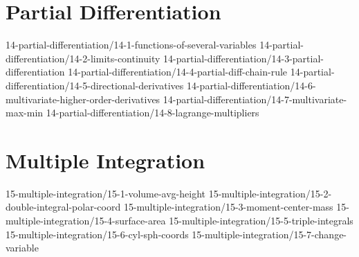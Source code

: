 
	
\chapter{Partial Differentiation}\label{chap:PartialDifferentiation}
	{14-partial-differentiation/14-1-functions-of-several-variables}
	{14-partial-differentiation/14-2-limits-continuity}
	{14-partial-differentiation/14-3-partial-differentiation}
	{14-partial-differentiation/14-4-partial-diff-chain-rule}
	{14-partial-differentiation/14-5-directional-derivatives}
	{14-partial-differentiation/14-6-multivariate-higher-order-derivatives}
	{14-partial-differentiation/14-7-multivariate-max-min}
	{14-partial-differentiation/14-8-lagrange-multipliers}
	
\chapter{Multiple Integration}\label{chap:MultipleIntegration}
	{15-multiple-integration/15-1-volume-avg-height}
	{15-multiple-integration/15-2-double-integral-polar-coord}
	{15-multiple-integration/15-3-moment-center-mass}
	{15-multiple-integration/15-4-surface-area}
	{15-multiple-integration/15-5-triple-integrals}
	{15-multiple-integration/15-6-cyl-sph-coords}
	{15-multiple-integration/15-7-change-variable}
	
